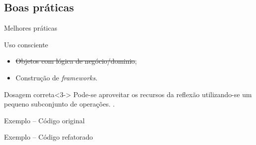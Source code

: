 \documentclass[12pt,t]{beamer}
\begin{document}
 	 \subsection{Boas práticas}
	 \begin{frame}{Melhores práticas}
	 	\begin{block}{Uso consciente}
	 		\begin{itemize}
	 			\item<1-> \sout{Objetos com lógica de negócio/dominio};
	 			\pause
	 			\item<2-> Construção de \emph{frameworks}.
	 		\end{itemize}
	 	\end{block}
	 	\begin{block}{Dosagem correta}<3->
	 		Pode-se aproveitar os recursos da reflexão utilizando-se um pequeno subconjunto de operações. \cite{bloch2008effective}.
	 	\end{block}
	 		{\begin{exampleblock}{Exemplo -- Código original}
	 				
	 		\end{exampleblock}}	
	 {\begin{exampleblock}{Exemplo -- Código refatorado}
	 			
	 		\end{exampleblock}}
	 		\textbf<5>{ }	
	 		
	 \end{frame}
\end{document}
